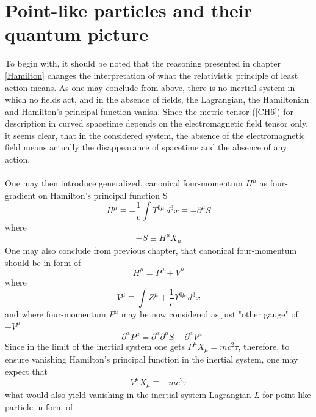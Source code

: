 \documentclass[aps,prx,preprint,groupedaddress,showkeys]{revtex4-2}
\begin{document}
\section{Point-like particles and their quantum picture} \label{Quantas}

To begin with, it should be noted that the reasoning presented in chapter \ref{Hamilton} changes the interpretation of what the relativistic principle of least action means. As one may conclude from above, there is no inertial system in which no fields act, and in the absence of fields, the Lagrangian, the Hamiltonian and Hamilton's principal function vanish. Since the metric tensor (\ref{CH6}) for description in curved spacetime depends on the electromagnetic field tensor only, it seems clear, that in the considered system, the absence of the electromagnetic field means actually the disappearance of spacetime and the absence of any action.\\
~\\
One may then introduce generalized, canonical four-momentum $H^{\mu}$ as four-gradient on Hamilton's principal function S
\begin{equation} \label{Q2}
H^{\mu} \equiv - \frac{1}{c} \int T^{0 \mu} \, d^3 x \equiv -\partial^{\mu} S
\end{equation}
where 
\begin{equation} \label{Q2a}
- S \equiv H^{\mu}X_{\mu}
\end{equation}
One may also conclude from previous chapter, that canonical four-momentum should be in form of
\begin{equation} \label{Q5}
H^{\mu} = P^{\mu} + V^{\mu} 
\end{equation}
where 
\begin{equation} \label{CD1}
V^{\mu} \equiv \int Z^{\mu} + \frac{1}{c} \Upsilon^{0 \mu} \, d^3 x
\end{equation}
and where four-momentum $P^{\mu}$ may be now considered as just "other gauge" of  $-V^{\mu}$ 
\begin{equation} \label{Q5b}
- \partial^{\alpha} P^{\mu} = \partial^{\alpha} \partial^{\mu} S + \partial^{\alpha} V^{\mu}
\end{equation}
Since in the limit of the inertial system one gets $P^{\mu} X_{\mu} = mc^2\tau$, therefore, to ensure vanishing Hamilton's principal function in the inertial system, one may expect that
\begin{equation} \label{Q1}
V^{\mu} X_{\mu} \equiv - mc^2 \tau 
\end{equation}
what would also yield vanishing in the inertial system Lagrangian $L$ for point-like particle in form of
\end{document}

